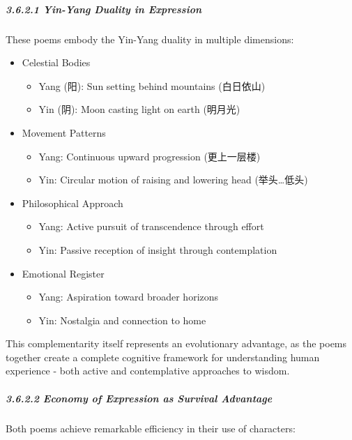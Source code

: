 \documentclass[
]{article}
\providecommand{\tightlist}{%
  \setlength{\itemsep}{0pt}\setlength{\parskip}{0pt}}
\begin{document}
\subparagraph{3.6.2.1 Yin-Yang Duality in
Expression}\label{yin-yang-duality-in-expression}

These poems embody the Yin-Yang duality in multiple dimensions:

\begin{itemize}
\tightlist
\item
  Celestial Bodies

  \begin{itemize}
  \tightlist
  \item
    Yang (阳): Sun setting behind mountains (白日依山)
  \item
    Yin (阴): Moon casting light on earth (明月光)
  \end{itemize}
\item
  Movement Patterns

  \begin{itemize}
  \tightlist
  \item
    Yang: Continuous upward progression (更上一层楼)
  \item
    Yin: Circular motion of raising and lowering head (举头\ldots 低头)
  \end{itemize}
\item
  Philosophical Approach

  \begin{itemize}
  \tightlist
  \item
    Yang: Active pursuit of transcendence through effort
  \item
    Yin: Passive reception of insight through contemplation
  \end{itemize}
\item
  Emotional Register

  \begin{itemize}
  \tightlist
  \item
    Yang: Aspiration toward broader horizons
  \item
    Yin: Nostalgia and connection to home
  \end{itemize}
\end{itemize}

This complementarity itself represents an evolutionary advantage, as the
poems together create a complete cognitive framework for understanding
human experience - both active and contemplative approaches to wisdom.

\subparagraph{3.6.2.2 Economy of Expression as Survival
Advantage}\label{economy-of-expression-as-survival-advantage}

Both poems achieve remarkable efficiency in their use of characters:
\end{document}
